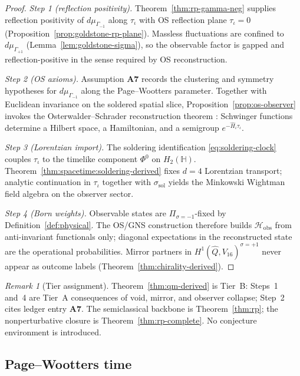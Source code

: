\documentclass[11pt]{article}
\theoremstyle{plain}
\theoremstyle{definition}
\theoremstyle{remark}
\newtheorem{remark}[theorem]{Remark}
\numberwithin{equation}{section}
\newcommand{\Quat}{\mathbb{H}}
\newcommand{\orderparam}{\Phi}
\begin{document}
\begin{proof}
\emph{Step 1 (reflection positivity).}
Theorem~\ref{thm:rp-gamma-neg} supplies reflection positivity of
$d\mu_{\Gamma_{-1}}$ along $\tau_\iota$ with OS reflection plane
$\tau_\iota=0$ (Proposition~\ref{prop:goldstone-rp-plane}). Massless
fluctuations are confined to $d\mu_{\Gamma_{+1}}$
(Lemma~\ref{lem:goldstone-sigma}), so the observable factor is gapped and
reflection-positive in the sense required by OS reconstruction.

\emph{Step 2 (OS axioms).}
Assumption \textbf{A7} records the clustering and symmetry hypotheses for
$d\mu_{\Gamma_{-1}}$ along the Page--Wootters parameter. Together with
Euclidean invariance on the soldered spatial slice, Proposition~\ref{prop:os-observer}
invokes the Osterwalder--Schrader reconstruction theorem
\cite{OsterwalderSchrader1973}: Schwinger functions determine a Hilbert space,
a Hamiltonian, and a semigroup $e^{-\hat H_\iota\tau_\iota}$.

\emph{Step 3 (Lorentzian import).}
The soldering identification \eqref{eq:soldering-clock} couples
$\tau_\iota$ to the timelike component $\orderparam^0$ on $H_2(\Quat)$.
Theorem~\ref{thm:spacetime:soldering-derived} fixes $d=4$ Lorentzian transport;
analytic continuation in $\tau_\iota$ together with $\sigma_{\mathrm{sol}}$
yields the Minkowski Wightman field algebra on the observer sector.

\emph{Step 4 (Born weights).}
Observable states are $\Pi_{\sigma=-1}$-fixed by Definition~\ref{def:physical}.
The OS/GNS construction therefore builds $\mathcal{H}_{\mathrm{obs}}$ from
anti-invariant functionals only; diagonal expectations in the reconstructed
state are the operational probabilities. Mirror partners in
$H^1(\hat Q,V_{16})^{\sigma=+1}$ never appear as outcome labels
(Theorem~\ref{thm:chirality-derived}).
\end{proof}

\begin{remark}[Tier assignment]
Theorem~\ref{thm:qm-derived} is Tier~B: Steps~1 and~4 are Tier~A consequences
of void, mirror, and observer collapse; Step~2 cites ledger entry \textbf{A7}.
The semiclassical backbone is Theorem~\ref{thm:rp}; the nonperturbative closure
is Theorem~\ref{thm:rp-complete}. No conjecture environment is introduced.
\end{remark}

\subsection{Page--Wootters time}
\end{document}
